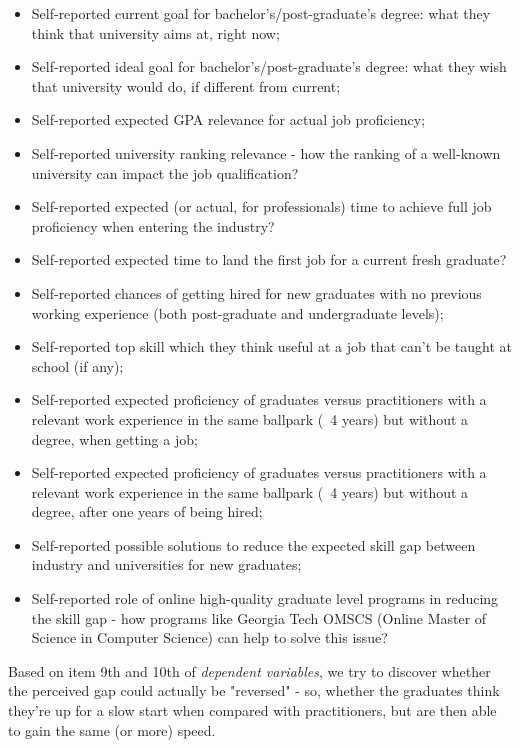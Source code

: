 \documentclass{sigchi}
\begin{document}
\begin{itemize}
	\item Self-reported current goal for bachelor's/post-graduate's degree: what they think that university aims at, right now;
	\item Self-reported ideal goal for bachelor's/post-graduate's degree: what they wish that university would do, if different from current;
	\item Self-reported expected GPA relevance for actual job proficiency;
	\item Self-reported university ranking relevance - how the ranking of a well-known university can impact the job qualification?
	\item Self-reported expected (or actual, for professionals) time to achieve full job proficiency when entering the industry?
	\item Self-reported expected time to land the first job for a current fresh graduate?
	\item Self-reported chances of getting hired for new graduates with no previous working experience (both post-graduate and undergraduate levels);
	\item Self-reported top skill which they think useful at a job that can't be taught at school (if any);
	\item Self-reported expected proficiency of graduates versus practitioners with a relevant work experience in the same ballpark (~4 years) but without a degree, when getting a job;
	\item Self-reported expected proficiency of graduates versus practitioners with a relevant work experience in the same ballpark (~4 years) but without a degree, after one years of being hired;
	\item Self-reported possible solutions to reduce the expected skill gap between industry and universities for new graduates; 
	\item Self-reported role of online high-quality graduate level programs in reducing the skill gap - how programs like Georgia Tech OMSCS (Online Master  of Science in Computer Science) can help to solve this issue?
\end{itemize}

Based on item 9th and 10th of \textit{dependent variables}, we try to discover whether the perceived gap could actually be "reversed" - so, whether the graduates think they're up for a slow start when compared with practitioners, but are then able to gain the same (or more) speed.
 
\end{document}
